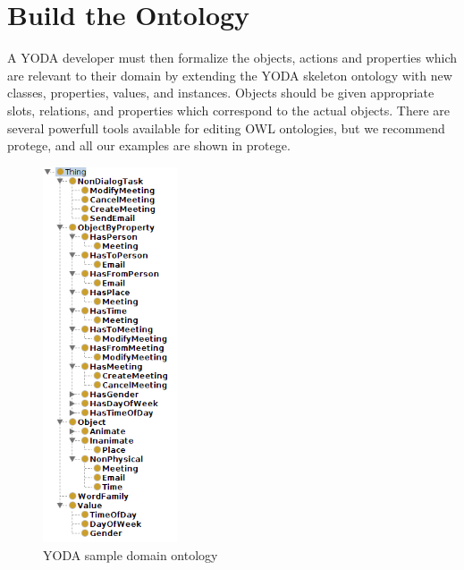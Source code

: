 \documentclass[10pt]{article}
\begin{document}


\section {Build the Ontology} \label{ontology-section}

A YODA developer must then formalize the objects, actions and properties which are relevant to their domain by extending the YODA skeleton ontology with new classes, properties, values, and instances.
Objects should be given appropriate slots, relations, and properties which correspond to the actual objects.
There are several powerfull tools available for editing OWL ontologies, but we recommend protege, and all our examples are shown in protege.


\begin{figure}[ht]
  \centering
  \includegraphics[width=150px]{sample-ontology-screenshot}
  \caption{YODA sample domain ontology}
  \label{sample-ontology-figure}
\end{figure}
\end{document}
